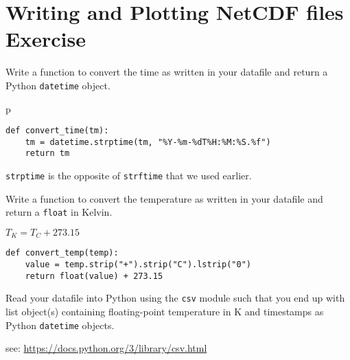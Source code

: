\documentclass[a4paper,11pt]{article}
\begin{document}
\section{Writing and Plotting NetCDF files Exercise}
\begin{question}
Write a function to convert the time as written in
your datafile and return a Python \texttt{datetime}
object.
\end{question}p
\newsavebox\timeconv
\begin{lrbox}{\timeconv}
\begin{minipage}{\textwidth}
\begin{verbatim}
def convert_time(tm):
    tm = datetime.strptime(tm, "%Y-%m-%dT%H:%M:%S.%f")
    return tm
\end{verbatim}
\end{minipage}
\end{lrbox}
\begin{solution}
\noindent\usebox\timeconv

\texttt{strptime} is the opposite of \texttt{strftime} that we used earlier.
\end{solution}
\begin{question}
Write a function to convert the temperature as
written in your datafile and return a \texttt{float} in
Kelvin.

{\center $T_K = T_C + 273.15$}
\end{question}
\newsavebox\tempconv
\begin{lrbox}{\tempconv}
\begin{minipage}{\textwidth}
\begin{verbatim}
def convert_temp(temp):
    value = temp.strip("+").strip("C").lstrip("0")
    return float(value) + 273.15
\end{verbatim}
\end{minipage}
\end{lrbox}
\begin{solution}
\noindent\usebox\tempconv
\end{solution}
\begin{question}
Read your datafile into Python using the \texttt{csv} module such
that you end up with list object(s) containing floating-point
temperature in K and timestamps as Python \texttt{datetime} objects.


see: \url{https://docs.python.org/3/library/csv.html}
\end{question}
\newsavebox\csvread
\end{document}
